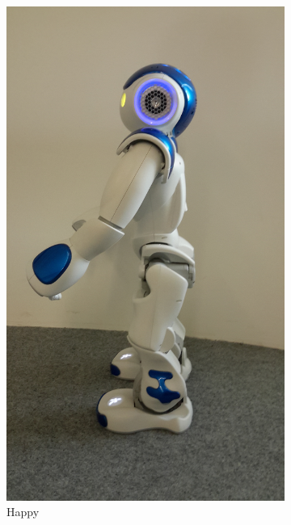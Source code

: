 \begin{figure}[h!]
        \begin{subfigure}[b]{0.18\textwidth}
                \includegraphics[width=\textwidth]{figures/happy.jpg}
                \caption{Happy}
                \label{fig:happy}
        \end{subfigure}%
        ~ %
        \begin{subfigure}[b]{0.18\textwidth}

\end{subfigure}
\end{figure}
